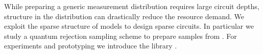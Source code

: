 While preparing a generic measurement distribution requires large circuit depths, structure in the distribution can drastically reduce the resource demand.
We exploit the sparse structure of \neuroSymbolicAI{} models to design sparse circuits.
In particular we study a quantum rejection sampling scheme to prepare samples from \ComputationActivationNetworks{}.
For experiments and prototyping we introduce the \python{} library \qcreason{}.